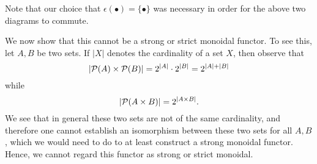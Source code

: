 \begin{example}
\begin{center}
    \end{center}
    Note that our choice that $\epsilon(\bullet) = \{\bullet\}$ was necessary in 
    order for the above two diagrams to commute. 

    We now show that this cannot be a strong or strict monoidal functor. To see this, let $A, B$ 
    be two sets. If $|X|$ denotes the cardinality of a set $X$, then observe that
    \[
        |\mathcal{P}(A) \times \mathcal{P}(B)| = 2^{|A|}\cdot 2^{|B|} = 2^{|A| + |B|}
    \]
    while 
    \[
        |\mathcal{P}(A \times B)| = 2^{|A\times B|}.   
    \]
    We see that in general these two sets are not of the same cardinality, 
    and therefore one cannot establish an isomorphism between these two sets for all $A, B$, 
    which we would need to do to at least construct a strong monoidal functor.
    Hence, we cannot regard this functor as strong or strict monoidal.
\end{example}

